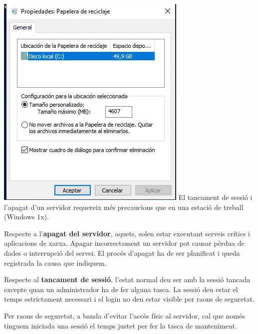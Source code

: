 \documentclass[
  a4paper,
]{article}
\begin{document}
\includegraphics{png/PapeleraWS.png} El tancament de sessió i l'apagat
d'un servidor requereix més precaucions que en una estació de treball
(Windows 1x).

Respecte a l'\textbf{apagat del servidor}, aquets, solen estar executant
serveis crítics i aplicacions de xarxa. Apagar incorrectament un
servidor pot causar pèrdua de dades o interrupció del servei. El procés
d'apagat ha de ser planificat i queda registrada la causa que indiquem.

Respecte al \textbf{tancament de sessió}, l'estat normal deu ser amb la
sessió tancada excepte quan un administrador ha de fer alguna tasca. La
sessió deu estar el temps estrictament necessari i el login no deu estar
visible per raons de seguretat.

Per raons de seguretat, a banda d'evitar l'accès físic al servidor, cal
que només tinguem iniciada una sessió el temps justet per fer la tasca
de manteniment.
\end{document}
